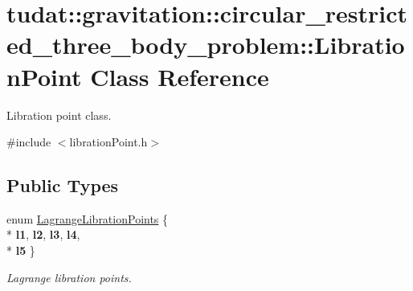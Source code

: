 \hypertarget{classtudat_1_1gravitation_1_1circular__restricted__three__body__problem_1_1LibrationPoint}{}\section{tudat\+:\+:gravitation\+:\+:circular\+\_\+restricted\+\_\+three\+\_\+body\+\_\+problem\+:\+:Libration\+Point Class Reference}
\label{classtudat_1_1gravitation_1_1circular__restricted__three__body__problem_1_1LibrationPoint}


Libration point class.  




{\ttfamily \#include $<$libration\+Point.\+h$>$}

\subsection*{Public Types}
\begin{DoxyCompactItemize}
\item 
enum \hyperlink{classtudat_1_1gravitation_1_1circular__restricted__three__body__problem_1_1LibrationPoint_a5214173f012fc769e5c89dba4fd2c741}{Lagrange\+Libration\+Points} \{ \\*
{\bfseries l1}, 
{\bfseries l2}, 
{\bfseries l3}, 
{\bfseries l4}, 
\\*
{\bfseries l5}
 \}\hypertarget{classtudat_1_1gravitation_1_1circular__restricted__three__body__problem_1_1LibrationPoint_a5214173f012fc769e5c89dba4fd2c741}{}\label{classtudat_1_1gravitation_1_1circular__restricted__three__body__problem_1_1LibrationPoint_a5214173f012fc769e5c89dba4fd2c741}
\begin{DoxyCompactList}\small\item\em Lagrange libration points. \end{DoxyCompactList}
\end{DoxyCompactItemize}
